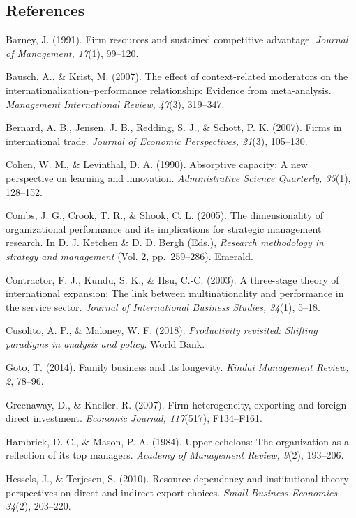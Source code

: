 \documentclass[
  12pt,a4paper]{article}
\begin{document}
\hypertarget{references}{%
\subsection{References}\label{references}}

Barney, J. (1991). Firm resources and sustained competitive advantage.
\emph{Journal of Management, 17}(1), 99--120.

Bausch, A., \& Krist, M. (2007). The effect of context-related
moderators on the internationalization--performance relationship:
Evidence from meta-analysis. \emph{Management International Review,
47}(3), 319--347.

Bernard, A. B., Jensen, J. B., Redding, S. J., \& Schott, P. K. (2007).
Firms in international trade. \emph{Journal of Economic Perspectives,
21}(3), 105--130.

Cohen, W. M., \& Levinthal, D. A. (1990). Absorptive capacity: A new
perspective on learning and innovation. \emph{Administrative Science
Quarterly, 35}(1), 128--152.

Combs, J. G., Crook, T. R., \& Shook, C. L. (2005). The dimensionality
of organizational performance and its implications for strategic
management research. In D. J. Ketchen \& D. D. Bergh (Eds.),
\emph{Research methodology in strategy and management} (Vol. 2,
pp.~259--286). Emerald.

Contractor, F. J., Kundu, S. K., \& Hsu, C.-C. (2003). A three-stage
theory of international expansion: The link between multinationality and
performance in the service sector. \emph{Journal of International
Business Studies, 34}(1), 5--18.

Cusolito, A. P., \& Maloney, W. F. (2018). \emph{Productivity revisited:
Shifting paradigms in analysis and policy}. World Bank.

Goto, T. (2014). Family business and its longevity. \emph{Kindai
Management Review, 2}, 78--96.

Greenaway, D., \& Kneller, R. (2007). Firm heterogeneity, exporting and
foreign direct investment. \emph{Economic Journal, 117}(517),
F134--F161.

Hambrick, D. C., \& Mason, P. A. (1984). Upper echelons: The
organization as a reflection of its top managers. \emph{Academy of
Management Review, 9}(2), 193--206.

Hessels, J., \& Terjesen, S. (2010). Resource dependency and
institutional theory perspectives on direct and indirect export choices.
\emph{Small Business Economics, 34}(2), 203--220.
\end{document}
